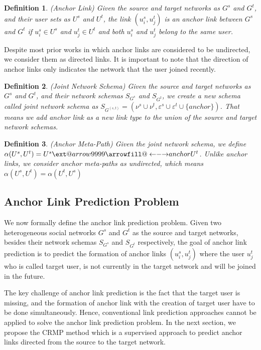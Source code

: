 \documentclass[conference]{IEEEtran}
\makeatletter
\newtheorem{definition}{Definition}[section]
\newcommand\xleftrightarrow[2][]{%
  \ext@arrow 9999{\longleftrightarrowfill@}{#1}{#2}}
\newcommand\longleftrightarrowfill@{%
  \arrowfill@\leftarrow\relbar\rightarrow}
\makeatother
\begin{document}
\begin{definition}{(Anchor Link)}
Given the source and target networks as $G^s$ and $G^t$, and their user sets as $U^s$ and $U^t$, the link $(u_i^s, u_j^t)$ is an anchor link between $G^s$ and $G^t$ if $u_i^s\in U^s$ and $u_j^t\in U^t$ and both $u_i^s$ and $u_j^t$ belong to the same user.
\end{definition}

Despite most prior works \cite{kong2013, zhang2013predicting, zhang2014transferring, zhang2014meta, zhang2015integrated} in which anchor links are considered to be undirected, we consider them as directed links. It is important to note that the direction of anchor links only indicates the network that the user joined recently.

\begin{definition}{(Joint Network Schema)}
Given the source and target networks as $G^s$ and $G^t$, and their network schemas $S_{G^s}$ and $S_{G^t}$, we create a new schema called \textit{joint network schema} as $S_{G^{(s,t)}}=(\nu^s\cup\nu^t, \varepsilon^s\cup\varepsilon^t\cup\{anchor\})$. That means we add anchor link as a new link type to the union of the source and target network schemas.
\end{definition}

\begin{definition}{(Anchor Meta-Path)}
Given the joint network schema, we define $\alpha(U^s,U^t)=U^s\xleftrightarrow{anchor}U^t$. Unlike anchor links, we consider anchor meta-paths as undirected, which means $\alpha(U^s,U^t)=\alpha(U^t,U^s)$
\end{definition}

\subsection{Anchor Link Prediction Problem}
We now formally define the anchor link prediction problem. Given two heterogeneous social networks $G^s$ and $G^t$ as the source and target networks, besides their network schemas $S_{G^s}$ and $S_{G^t}$ respectively, the goal of anchor link prediction is to predict the formation of anchor links $(u_i^s, u_j^t)$ where the user $u_j^t$ who is called target user, is not currently in the target network and will be joined in the future.

The key challenge of anchor link prediction is the fact that the target user is missing, and the formation of anchor link with the creation of target user have to be done simultaneously. Hence, conventional link prediction approaches cannot be applied to solve the anchor link prediction problem. In the next section, we propose the CRMP method which is a supervised approach to predict anchor links directed from the source to the target network.
\end{document}
